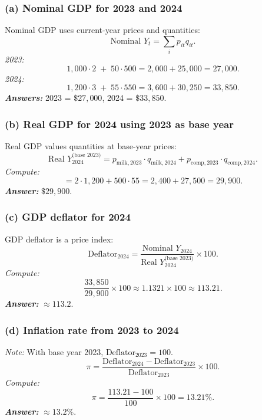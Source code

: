 \documentclass[11pt]{article}
\begin{document}
\subsubsection*{(a) Nominal GDP for 2023 and 2024}
Nominal GDP uses current-year prices and quantities:
\[
\text{Nominal }Y_t=\sum_i p_{it}q_{it}.
\]
\emph{2023:}
\[
1{,}000\cdot 2\;+\;50\cdot 500
=2{,}000+25{,}000
=27{,}000.
\]
\emph{2024:}
\[
1{,}200\cdot 3\;+\;55\cdot 550
=3{,}600+30{,}250
=33{,}850.
\]
\emph{\textbf{Answers:}} 2023 = \(\$27{,}000\), 2024 = \(\$33{,}850\).

\subsubsection*{(b) Real GDP for 2024 using 2023 as base year}
Real GDP values quantities at base-year prices:
\[
\text{Real }Y_{2024}^{\text{(base 2023)}}=
p_{\text{milk},2023}\cdot q_{\text{milk},2024}
+
p_{\text{comp},2023}\cdot q_{\text{comp},2024}.
\]
\emph{Compute:}
\[
=2\cdot 1{,}200 + 500\cdot 55
=2{,}400+27{,}500
=29{,}900.
\]
\emph{\textbf{Answer:}} \(\$29{,}900\).

\subsubsection*{(c) GDP deflator for 2024}
GDP deflator is a price index:
\[
\text{Deflator}_{2024}=\frac{\text{Nominal }Y_{2024}}{\text{Real }Y_{2024}^{\text{(base 2023)}}}\times 100.
\]
\emph{Compute:}
\[
\frac{33{,}850}{29{,}900}\times 100
\approx 1.1321\times 100
\approx 113.21.
\]
\emph{\textbf{Answer:}} \(\approx 113.2\).

\subsubsection*{(d) Inflation rate from 2023 to 2024}
\emph{Note:} With base year 2023, \(\text{Deflator}_{2023}=100\).\\

\[
\pi=\frac{\text{Deflator}_{2024}-\text{Deflator}_{2023}}{\text{Deflator}_{2023}}\times 100.
\]
\emph{Compute:}
\[
\pi=\frac{113.21-100}{100}\times 100
=13.21\%.
\]
\emph{\textbf{Answer:}} \(\approx 13.2\%\).
\end{document}
